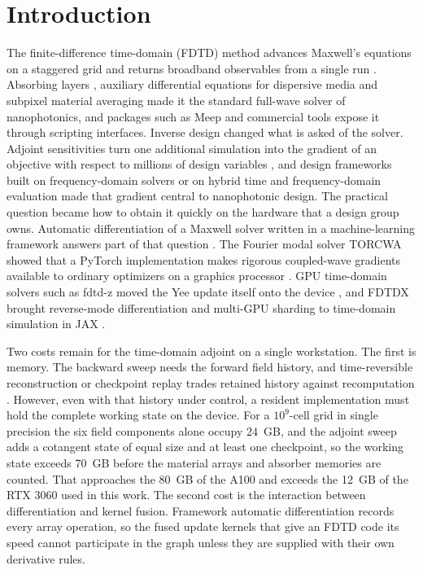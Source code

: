 \documentclass[11pt,a4paper]{article}
\begin{document}
\section{Introduction}

The finite-difference time-domain (FDTD) method advances Maxwell's equations on a staggered grid and returns broadband observables from a single run \citep{yee1966,taflove2005}. Absorbing layers \citep{berenger1994,roden2000}, auxiliary differential equations for dispersive media \citep{okoniewski1997} and subpixel material averaging \citep{farjadpour2006} made it the standard full-wave solver of nanophotonics, and packages such as Meep \citep{oskooi2010} and commercial tools \citep{lumerical,tidy3d} expose it through scripting interfaces. Inverse design changed what is asked of the solver. Adjoint sensitivities turn one additional simulation into the gradient of an objective with respect to millions of design variables \citep{georgieva2002,jensen2011,elesin2012,piggott2015,molesky2018,hughes2018,christiansen2021}, and design frameworks built on frequency-domain solvers \citep{su2020,minkov2020} or on hybrid time and frequency-domain evaluation \citep{hammond2022} made that gradient central to nanophotonic design. The practical question became how to obtain it quickly on the hardware that a design group owns. Automatic differentiation of a Maxwell solver written in a machine-learning framework answers part of that question \citep{hughes2019}. The Fourier modal solver TORCWA showed that a PyTorch implementation makes rigorous coupled-wave gradients available to ordinary optimizers on a graphics processor \citep{kim2023}. GPU time-domain solvers such as fdtd-z moved the Yee update itself onto the device \citep{fdtdz}, and FDTDX brought reverse-mode differentiation and multi-GPU sharding to time-domain simulation in JAX \citep{mahlau2024}.

Two costs remain for the time-domain adjoint on a single workstation. The first is memory. The backward sweep needs the forward field history, and time-reversible reconstruction or checkpoint replay trades retained history against recomputation \citep{griewank2000,mahlau2024,mahlau2026}. However, even with that history under control, a resident implementation must hold the complete working state on the device. For a $10^9$-cell grid in single precision the six field components alone occupy 24~GB, and the adjoint sweep adds a cotangent state of equal size and at least one checkpoint, so the working state exceeds 70~GB before the material arrays and absorber memories are counted. That approaches the 80~GB of the A100 and exceeds the 12~GB of the RTX 3060 used in this work. The second cost is the interaction between differentiation and kernel fusion. Framework automatic differentiation records every array operation, so the fused update kernels that give an FDTD code its speed cannot participate in the graph unless they are supplied with their own derivative rules.
\end{document}
